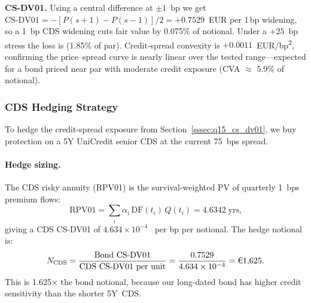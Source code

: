 \documentclass[11pt,a4paper]{article}
\begin{document}
\noindent\textbf{CS-DV01.}\quad
Using a central difference at $\pm 1$~bp we get
$\text{CS-DV01} = -[P(s{+}1) - P(s{-}1)]/2 = +0.7529$~EUR per 1\,bp
widening, so a 1~bp CDS widening cuts fair value by 0.075\% of notional.
Under a $+25$~bp stress the loss is  (1.85\% of par).
Credit-spread convexity is $+0.0011$~EUR/bp\textsuperscript{2},
confirming the price--spread curve is nearly linear over the tested
range---expected for a bond priced near par with moderate credit
exposure (CVA $\approx$ 5.9\% of notional).

\subsubsection{CDS Hedging Strategy}
\label{sssec:q16_cds_hedge}

To hedge the credit-spread exposure from
Section~\ref{sssec:q15_cs_dv01}, we buy protection on a 5Y
UniCredit senior CDS at the current 75~bps spread.

\paragraph{Hedge sizing.}
The CDS risky annuity (RPV01) is the survival-weighted PV of
quarterly 1~bps premium flows:
\begin{equation}
  \text{RPV01}
  = \sum_{i} \alpha_i \, \mathrm{DF}(t_i) \, Q(t_i)
  = 4.6342 \;\text{yrs,}
  \label{eq:q16_rpv01}
\end{equation}
giving a CDS CS-DV01 of $4.634 \times 10^{-4}$~\texteuro{} per bp
per  notional.  The hedge notional is:
\begin{equation}
  N_{\text{CDS}}
  = \frac{\text{Bond CS-DV01}}{\text{CDS CS-DV01 per unit}}
  = \frac{0.7529}{4.634 \times 10^{-4}}
  = \text{\texteuro1,625.}
  \label{eq:q16_hedge_notl}
\end{equation}
This is 1.625$\times$ the bond notional, because our long-dated
bond has higher credit sensitivity than the shorter 5Y~CDS.
\end{document}
